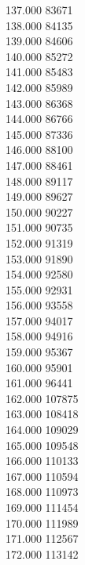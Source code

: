 { 137.000	83671 \\
 138.000	84135 \\
 139.000	84606 \\
 140.000	85272 \\
 141.000	85483 \\
 142.000	85989 \\
 143.000	86368 \\
 144.000	86766 \\
 145.000	87336 \\
 146.000	88100 \\
 147.000	88461 \\
 148.000	89117 \\
 149.000	89627 \\
 150.000	90227 \\
 151.000	90735 \\
 152.000	91319 \\
 153.000	91890 \\
 154.000	92580 \\
 155.000	92931 \\
 156.000	93558 \\
 157.000	94017 \\
 158.000	94916 \\
 159.000	95367 \\
 160.000	95901 \\
 161.000	96441 \\
 162.000	107875 \\
 163.000	108418 \\
 164.000	109029 \\
 165.000	109548 \\
 166.000	110133 \\
 167.000	110594 \\
 168.000	110973 \\
 169.000	111454 \\
 170.000	111989 \\
 171.000	112567 \\
 172.000	113142 \\
}
